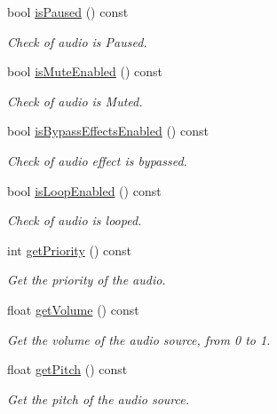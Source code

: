 \begin{DoxyCompactItemize}
bool \hyperlink{class_magnum_1_1_audio_source_base_aea802686d2ca8cc4491cebbf165d1f81}{is\+Paused} () const 
\begin{DoxyCompactList}\small\item\em Check of audio is Paused. \end{DoxyCompactList}\item 
bool \hyperlink{class_magnum_1_1_audio_source_base_a621c2d2081d06980314cfd0cbca47abb}{is\+Mute\+Enabled} () const 
\begin{DoxyCompactList}\small\item\em Check of audio is Muted. \end{DoxyCompactList}\item 
bool \hyperlink{class_magnum_1_1_audio_source_base_ac88502844fe48dee7fcecb82bc784b15}{is\+Bypass\+Effects\+Enabled} () const 
\begin{DoxyCompactList}\small\item\em Check of audio effect is bypassed. \end{DoxyCompactList}\item 
bool \hyperlink{class_magnum_1_1_audio_source_base_a3bc651b14d433eeb38b170a35f8065d2}{is\+Loop\+Enabled} () const 
\begin{DoxyCompactList}\small\item\em Check of audio is looped. \end{DoxyCompactList}\item 
int \hyperlink{class_magnum_1_1_audio_source_base_a92c0b80da27c9767a3f5cffb2d269533}{get\+Priority} () const 
\begin{DoxyCompactList}\small\item\em Get the priority of the audio. \end{DoxyCompactList}\item 
float \hyperlink{class_magnum_1_1_audio_source_base_a6109b9701bcccd30cf12384f3ee74264}{get\+Volume} () const 
\begin{DoxyCompactList}\small\item\em Get the volume of the audio source, from 0 to 1. \end{DoxyCompactList}\item 
float \hyperlink{class_magnum_1_1_audio_source_base_a55b153ae8bf8b5a6130fd3dd703d3b77}{get\+Pitch} () const 
\begin{DoxyCompactList}\small\item\em Get the pitch of the audio source. \end{DoxyCompactList}\item 

\end{DoxyCompactItemize}
